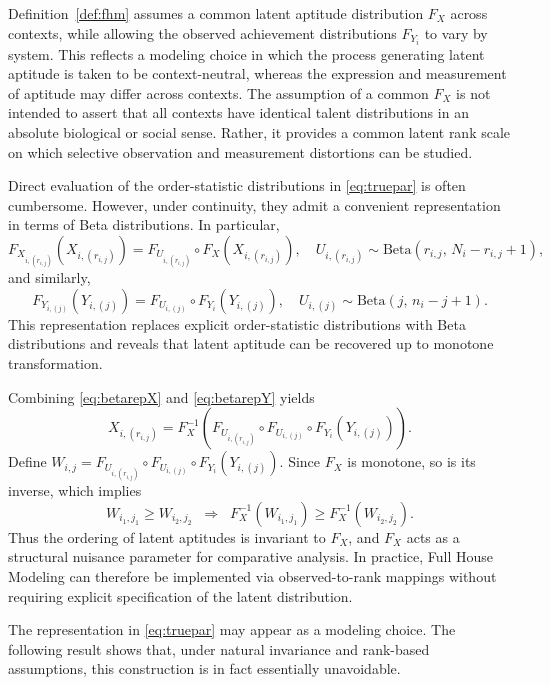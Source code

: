 \documentclass[12pt]{article}
\begin{document}
Definition~\ref{def:fhm} assumes a common latent aptitude distribution $F_X$ across contexts, while allowing the observed achievement distributions $F_{Y_i}$ to vary by system. This reflects a modeling choice in which the process generating latent aptitude is taken to be context-neutral, whereas the expression and measurement of aptitude may differ across contexts. The assumption of a common $F_X$ is not intended to assert that all contexts have identical talent distributions in an absolute biological or social sense. Rather, it provides a common latent rank scale on which selective observation and measurement distortions can be studied.

Direct evaluation of the order-statistic distributions in \eqref{eq:truepar} is often cumbersome. However, under continuity, they admit a convenient representation in terms of Beta distributions. In particular,
\begin{equation} \label{eq:betarepX}
F_{X_{i,(r_{i,j})}}\!\left(X_{i,(r_{i,j})}\right)
= F_{U_{i,(r_{i,j})}} \circ F_X\!\left(X_{i,(r_{i,j})}\right),
\quad U_{i,(r_{i,j})} \sim \mathrm{Beta}\!\left(r_{i,j},\, N_i - r_{i,j} + 1\right),
\end{equation}
and similarly,
\begin{equation} \label{eq:betarepY}
F_{Y_{i,(j)}}\!\left(Y_{i,(j)}\right)
= F_{U_{i,(j)}} \circ F_{Y_i}\!\left(Y_{i,(j)}\right),
\quad U_{i,(j)} \sim \mathrm{Beta}\!\left(j,\, n_i - j + 1\right).
\end{equation}
This representation replaces explicit order-statistic distributions with Beta distributions and reveals that latent aptitude can be recovered up to monotone transformation.

Combining \eqref{eq:betarepX} and \eqref{eq:betarepY} yields
$$
X_{i,(r_{i,j})} = F_X^{-1}\!\left(
F_{U_{i,(r_{i,j})}} \circ F_{U_{i,(j)}} \circ F_{Y_i}\!\left(Y_{i,(j)}\right)
\right).
$$
Define $W_{i,j} = F_{U_{i,(r_{i,j})}} \circ F_{U_{i,(j)}} \circ F_{Y_i}(Y_{i,(j)})$. Since $F_X$ is monotone, so is its inverse, which implies
$$
W_{i_1,j_1} \ge W_{i_2,j_2} \;\;\Longrightarrow\;\; 
F_X^{-1}(W_{i_1,j_1}) \ge F_X^{-1}(W_{i_2,j_2}).
$$
Thus the ordering of latent aptitudes is invariant to $F_X$, and $F_X$ acts as a structural nuisance parameter for comparative analysis. In practice, Full House Modeling can therefore be implemented via observed-to-rank mappings without requiring explicit specification of the latent distribution.

The representation in \eqref{eq:truepar} may appear as a modeling choice. The following result shows that, under natural invariance and rank-based assumptions, this construction is in fact essentially unavoidable.
\end{document}
